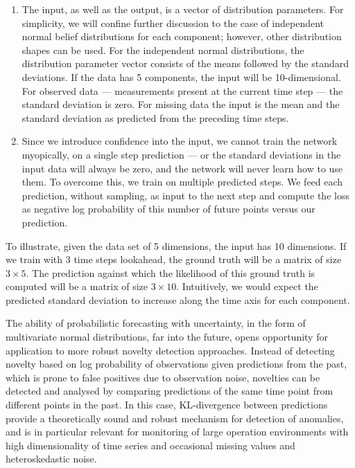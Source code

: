 \documentclass[runningheads]{llncs}
\begin{document}
\begin{enumerate}
\item The input, as well as the output, is a vector of
distribution parameters. For simplicity, we will confine further
discussion to the case of independent normal belief
distributions for each component; however, other distribution
shapes can be used. For the independent normal
distributions, the distribution parameter vector consists of the
means followed by the standard deviations. If the data has 5
components, the input will be 10-dimensional. For observed data
--- measurements present at the current time step --- the
standard deviation is zero. For missing data the input is the
mean and the standard deviation as predicted from the preceding
time steps.

\item Since we introduce confidence into the input, we cannot
train the network myopically, on a single step prediction --- or
the standard deviations in the input data will always be zero,
and the network will never learn how to use them. To overcome
this, we train on multiple predicted steps. We feed each
prediction, without sampling, as input to the next step and
compute the loss as negative log probability of this number of
future points versus our prediction.
\end{enumerate}

To illustrate, given the data set of 5 dimensions, the input has 10
dimensions. If we train with 3 time steps lookahead, the ground
truth will be a matrix of size $3\times 5$. The prediction against
which the likelihood of this ground truth is computed will be
a matrix of size $3 \times 10$. Intuitively, we would expect the
predicted standard deviation to increase along the time axis
for each component.

The ability of probabilistic forecasting with uncertainty, in
the form of multivariate normal distributions, far into the
future, opens opportunity for application to more robust
novelty detection approaches. Instead of detecting novelty based
on log probability of observations given predictions from the
past, which is prone to false positives due to observation
noise, novelties can be detected and analysed by comparing
predictions of the same time point from different points in the
past. In this case, KL-divergence between predictions provide a
theoretically sound and robust mechanism for detection of
anomalies, and is in particular relevant for monitoring of large
operation environments with high dimensionality of time series
and occasional missing values and heteroskedastic noise.
\end{document}
